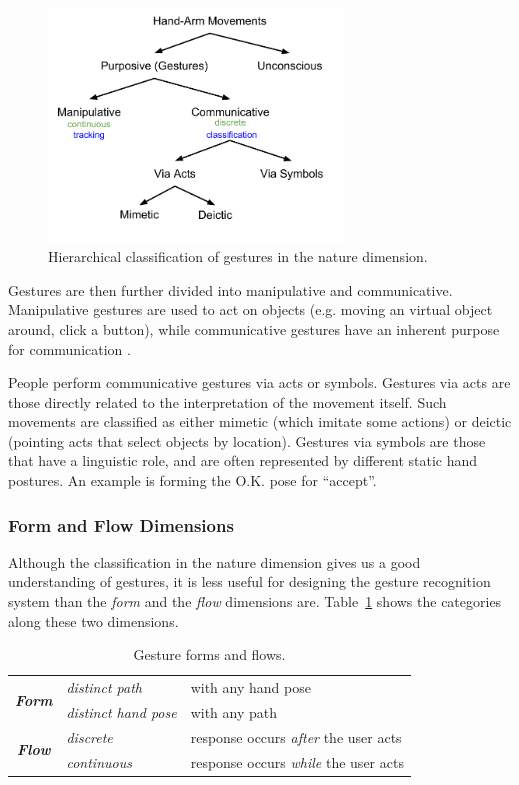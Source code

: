 \begin{figure}[tbh]
  \centering
  \includegraphics[width=0.7\textwidth]{figures/taxonomy.pdf} 
  \caption{Hierarchical classification of gestures in the nature
  dimension.}
  \label{fig:taxonomy}
\end{figure}

Gestures are then further divided into manipulative and communicative. Manipulative gestures are used to act on objects (e.g.
moving an virtual object around, click a button), while
communicative gestures have an inherent purpose for communication \cite{Pavlovic97}. 

People perform communicative gestures via acts or symbols. Gestures via acts are
those directly related to the interpretation of the movement itself. Such
movements are classified as either mimetic (which imitate some actions) or
deictic (pointing acts that select objects by location).
Gestures via symbols are those that have a linguistic role, and are often represented by different static hand postures. An example is forming the
O.K. pose for ``accept''. 

\subsubsection{Form and Flow Dimensions}
Although the classification in the nature dimension gives us a good
understanding of gestures, it is less useful for designing the gesture
recognition system than the \textit{form} and the \textit{flow} dimensions are.
Table~\ref{tab:taxonomy} shows the categories along these two dimensions.

\begin{table}[tbh]
\centering
\begin{tabular}{|c|l|l|}
\hline
\multirow{2}{*}{\textbf{\textit{Form}}} & \textit{distinct path} & with any hand
pose
\\
\cline{2-3} 
                               & \textit{distinct hand pose} & with any path \\
\hline
\multirow{2}{*}{\textbf{\textit{Flow}}} & \textit{discrete} & response occurs
\textit{after} the user acts \\
\cline{2-3}
              & \textit{continuous} & response occurs \textit{while} the user
              acts \\
\hline
\end{tabular}
\caption{Gesture forms and flows.}
\label{tab:taxonomy}
\end{table}


